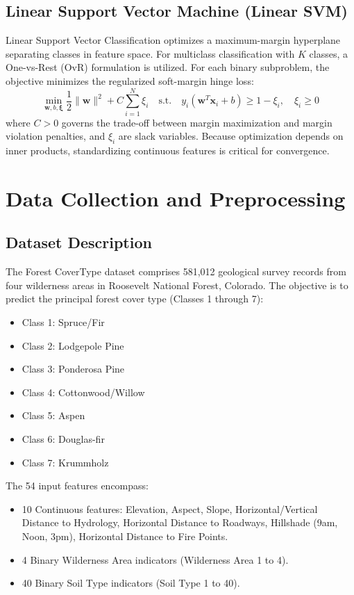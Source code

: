 \subsection{Linear Support Vector Machine (Linear SVM)}
Linear Support Vector Classification optimizes a maximum-margin hyperplane separating classes in feature space. For multiclass classification with $K$ classes, a One-vs-Rest (OvR) formulation is utilized. For each binary subproblem, the objective minimizes the regularized soft-margin hinge loss:
\begin{equation}
    \min_{\mathbf{w}, b, \boldsymbol{\xi}} \frac{1}{2} \|\mathbf{w}\|^2 + C \sum_{i=1}^N \xi_i \quad \text{s.t.} \quad y_i (\mathbf{w}^T \mathbf{x}_i + b) \ge 1 - \xi_i, \quad \xi_i \ge 0
\end{equation}
where $C > 0$ governs the trade-off between margin maximization and margin violation penalties, and $\xi_i$ are slack variables. Because optimization depends on inner products, standardizing continuous features is critical for convergence.

\section{Data Collection and Preprocessing}
\label{sec:data_preprocessing}

\subsection{Dataset Description}
The Forest CoverType dataset comprises 581,012 geological survey records from four wilderness areas in Roosevelt National Forest, Colorado. The objective is to predict the principal forest cover type (Classes 1 through 7):
\begin{itemize}
    \item Class 1: Spruce/Fir
    \item Class 2: Lodgepole Pine
    \item Class 3: Ponderosa Pine
    \item Class 4: Cottonwood/Willow
    \item Class 5: Aspen
    \item Class 6: Douglas-fir
    \item Class 7: Krummholz
\end{itemize}
The 54 input features encompass:
\begin{itemize}
    \item 10 Continuous features: Elevation, Aspect, Slope, Horizontal/Vertical Distance to Hydrology, Horizontal Distance to Roadways, Hillshade (9am, Noon, 3pm), Horizontal Distance to Fire Points.
    \item 4 Binary Wilderness Area indicators (Wilderness Area 1 to 4).
    \item 40 Binary Soil Type indicators (Soil Type 1 to 40).
\end{itemize}

